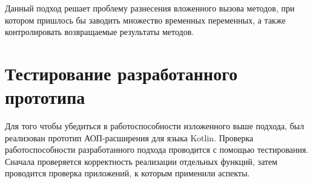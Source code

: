 \documentclass[conference]{IEEEtran}
\begin{document}
Данный подход решает проблему разнесения вложенного вызова методов, при котором 
пришлось бы заводить множество временных переменных, а также контролировать 
возвращаемые результаты методов. 



\section{Тестирование разработанного прототипа}


Для того чтобы убедиться в работоспособности изложенного выше подхода, был
реализован прототип АОП-расширения для языка Kotlin.
Проверка работоспособности разработанного подхода проводится с помощью
тестирования.
Сначала проверяется корректность реализации отдельных функций, затем проводится 
проверка приложений, к которым применили аспекты. 
\end{document}

